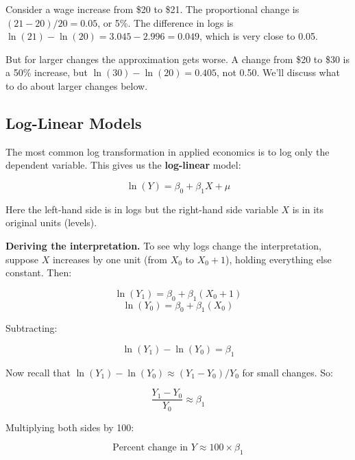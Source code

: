 \documentclass[
  letterpaper,
  DIV=11,
  numbers=noendperiod]{scrreprt}
\begin{document}
\begin{tcolorbox}[enhanced jigsaw, arc=.35mm, bottomrule=.15mm, bottomtitle=1mm, breakable, colback=white, colbacktitle=quarto-callout-note-color!10!white, colframe=quarto-callout-note-color-frame, coltitle=black, left=2mm, leftrule=.75mm, opacityback=0, opacitybacktitle=0.6, rightrule=.15mm, title=\textcolor{quarto-callout-note-color}{\faInfo}\hspace{0.5em}{Why This Approximation Works}, titlerule=0mm, toprule=.15mm, toptitle=1mm]

Consider a wage increase from \$20 to \$21. The proportional change is
\((21-20)/20 = 0.05\), or 5\%. The difference in logs is
\(\ln(21) - \ln(20) = 3.045 - 2.996 = 0.049\), which is very close to
0.05.

But for larger changes the approximation gets worse. A change from \$20
to \$30 is a 50\% increase, but \(\ln(30) - \ln(20) = 0.405\), not 0.50.
We'll discuss what to do about larger changes below.

\end{tcolorbox}

\subsection{Log-Linear Models}\label{log-linear-models}

The most common log transformation in applied economics is to log only
the dependent variable. This gives us the \textbf{log-linear} model:

\[
\ln(Y) = \beta_0 + \beta_1 X + \mu
\]

Here the left-hand side is in logs but the right-hand side variable
\(X\) is in its original units (levels).

\textbf{Deriving the interpretation.} To see why logs change the
interpretation, suppose \(X\) increases by one unit (from \(X_0\) to
\(X_0 + 1\)), holding everything else constant. Then:

\[
\ln(Y_1) = \beta_0 + \beta_1(X_0 + 1)
\] \[
\ln(Y_0) = \beta_0 + \beta_1(X_0)
\]

Subtracting:

\[
\ln(Y_1) - \ln(Y_0) = \beta_1
\]

Now recall that \(\ln(Y_1) - \ln(Y_0) \approx (Y_1 - Y_0)/Y_0\) for
small changes. So:

\[
\frac{Y_1 - Y_0}{Y_0} \approx \beta_1
\]

Multiplying both sides by 100:

\[
\text{Percent change in } Y \approx 100 \times \beta_1
\]
\end{document}
